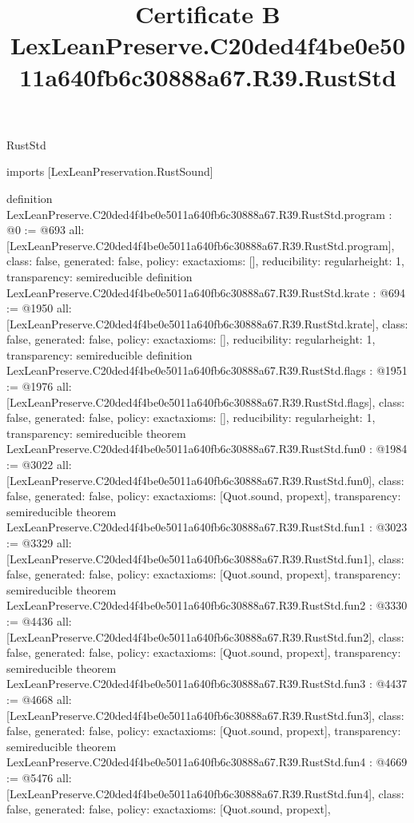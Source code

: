 \begin{lexlean}{RustStd}
\title{Certificate B LexLeanPreserve.C20ded4f4be0e5011a640fb6c30888a67.R39.RustStd}
\begin{coremodule}
imports [LexLeanPreservation.RustSound]

definition LexLeanPreserve.C20ded4f4be0e5011a640fb6c30888a67.R39.RustStd.program : @0 := @693 {
  all: [LexLeanPreserve.C20ded4f4be0e5011a640fb6c30888a67.R39.RustStd.program],
  class: false,
  generated: false,
  policy: exact{axioms: []},
  reducibility: regular{height: 1},
  transparency: semireducible
}
definition LexLeanPreserve.C20ded4f4be0e5011a640fb6c30888a67.R39.RustStd.krate : @694 := @1950 {
  all: [LexLeanPreserve.C20ded4f4be0e5011a640fb6c30888a67.R39.RustStd.krate],
  class: false,
  generated: false,
  policy: exact{axioms: []},
  reducibility: regular{height: 1},
  transparency: semireducible
}
definition LexLeanPreserve.C20ded4f4be0e5011a640fb6c30888a67.R39.RustStd.flags : @1951 := @1976 {
  all: [LexLeanPreserve.C20ded4f4be0e5011a640fb6c30888a67.R39.RustStd.flags],
  class: false,
  generated: false,
  policy: exact{axioms: []},
  reducibility: regular{height: 1},
  transparency: semireducible
}
theorem LexLeanPreserve.C20ded4f4be0e5011a640fb6c30888a67.R39.RustStd.fun0 : @1984 := @3022 {
  all: [LexLeanPreserve.C20ded4f4be0e5011a640fb6c30888a67.R39.RustStd.fun0],
  class: false,
  generated: false,
  policy: exact{axioms: [Quot.sound, propext]},
  transparency: semireducible
}
theorem LexLeanPreserve.C20ded4f4be0e5011a640fb6c30888a67.R39.RustStd.fun1 : @3023 := @3329 {
  all: [LexLeanPreserve.C20ded4f4be0e5011a640fb6c30888a67.R39.RustStd.fun1],
  class: false,
  generated: false,
  policy: exact{axioms: [Quot.sound, propext]},
  transparency: semireducible
}
theorem LexLeanPreserve.C20ded4f4be0e5011a640fb6c30888a67.R39.RustStd.fun2 : @3330 := @4436 {
  all: [LexLeanPreserve.C20ded4f4be0e5011a640fb6c30888a67.R39.RustStd.fun2],
  class: false,
  generated: false,
  policy: exact{axioms: [Quot.sound, propext]},
  transparency: semireducible
}
theorem LexLeanPreserve.C20ded4f4be0e5011a640fb6c30888a67.R39.RustStd.fun3 : @4437 := @4668 {
  all: [LexLeanPreserve.C20ded4f4be0e5011a640fb6c30888a67.R39.RustStd.fun3],
  class: false,
  generated: false,
  policy: exact{axioms: [Quot.sound, propext]},
  transparency: semireducible
}
theorem LexLeanPreserve.C20ded4f4be0e5011a640fb6c30888a67.R39.RustStd.fun4 : @4669 := @5476 {
  all: [LexLeanPreserve.C20ded4f4be0e5011a640fb6c30888a67.R39.RustStd.fun4],
  class: false,
  generated: false,
  policy: exact{axioms: [Quot.sound, propext]},
}
\end{coremodule}
\end{lexlean}
